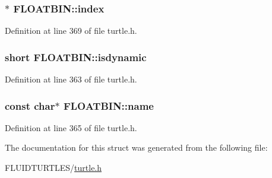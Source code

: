 \hypertarget{struct_f_l_o_a_t_b_i_n_a8f47d03b13305d9d9ae7ec4b9df99e87}{
\subsubsection[{index}]{$\ast$ F\-L\-O\-A\-T\-B\-I\-N\-::index}}\label{struct_f_l_o_a_t_b_i_n_a8f47d03b13305d9d9ae7ec4b9df99e87}


Definition at line 369 of file turtle.\-h.

\hypertarget{struct_f_l_o_a_t_b_i_n_a89c2dc26cd1948fc8bf3dd37fbe61941}{
\subsubsection[{isdynamic}]{\setlength{\rightskip}{0pt plus 5cm}short F\-L\-O\-A\-T\-B\-I\-N\-::isdynamic}}\label{struct_f_l_o_a_t_b_i_n_a89c2dc26cd1948fc8bf3dd37fbe61941}


Definition at line 363 of file turtle.\-h.

\hypertarget{struct_f_l_o_a_t_b_i_n_a2be70d1883990d65b5d830f42e40b6c4}{
\subsubsection[{name}]{\setlength{\rightskip}{0pt plus 5cm}const char$\ast$ F\-L\-O\-A\-T\-B\-I\-N\-::name}}\label{struct_f_l_o_a_t_b_i_n_a2be70d1883990d65b5d830f42e40b6c4}


Definition at line 365 of file turtle.\-h.



The documentation for this struct was generated from the following file\-:\begin{DoxyCompactItemize}
\item 
F\-L\-U\-I\-D\-T\-U\-R\-T\-L\-E\-S/\hyperlink{turtle_8h}{turtle.\-h}\end{DoxyCompactItemize}
